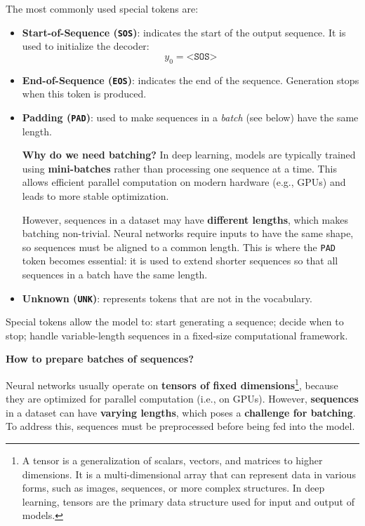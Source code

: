 \highspace
The most commonly used special tokens are:
\begin{itemize}
    \item[\textcolor{Green3}{\faIcon{play}}] \textbf{Start-of-Sequence (\texttt{SOS})}: indicates the start of the output sequence. It is used to initialize the decoder:
    \begin{equation*}
        y_0 = \texttt{<SOS>}
    \end{equation*}


    \item[\textcolor{Green3}{\faIcon{stop}}] \textbf{End-of-Sequence (\texttt{EOS})}: indicates the end of the sequence. Generation stops when this token is produced.


    \item[\textcolor{Green3}{\faIcon{square}}] \textbf{Padding (\texttt{PAD})}: used to make sequences in a \emph{batch} (see below) have the same length.

    \textcolor{Green3}{ \textbf{Why do we need batching?}} In deep learning, models are typically trained using \textbf{mini-batches} rather than processing one sequence at a time. This allows efficient parallel computation on modern hardware (e.g., GPUs) and leads to more stable optimization.

    However, sequences in a dataset may have \textbf{different lengths}, which makes batching non-trivial. Neural networks require inputs to have the same shape, so sequences must be aligned to a common length. This is where the \texttt{PAD} token becomes essential: it is used to extend shorter sequences so that all sequences in a batch have the same length.


    \item[\textcolor{Green3}{\faIcon{question}}] \textbf{Unknown (\texttt{UNK})}: represents tokens that are not in the vocabulary.
\end{itemize}
Special tokens allow the model to: start generating a sequence; decide when to stop; handle variable-length sequences in a fixed-size computational framework.

\highspace
\begin{flushleft}
    \textcolor{Green3}{\faIcon{\speedIcon} \textbf{How to prepare batches of sequences?}}
\end{flushleft}
Neural networks usually operate on \textbf{tensors of fixed dimensions}\footnote{%
    A tensor is a generalization of scalars, vectors, and matrices to higher dimensions. It is a multi-dimensional array that can represent data in various forms, such as images, sequences, or more complex structures. In deep learning, tensors are the primary data structure used for input and output of models.%
}, because they are optimized for parallel computation (i.e., on GPUs). However, \textbf{sequences} in a dataset can have \textbf{varying lengths}, which poses a \textbf{challenge for batching}. To address this, sequences must be preprocessed before being fed into the model.

